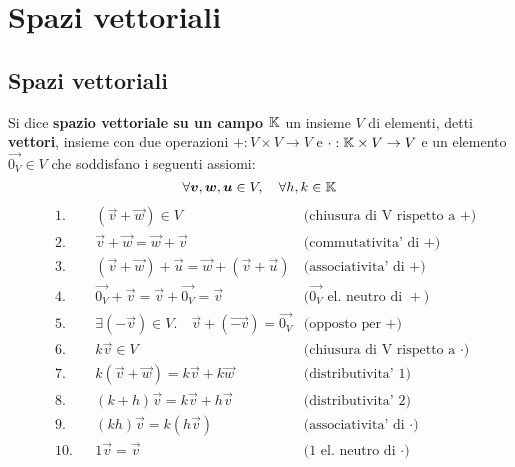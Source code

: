\chapter{Spazi vettoriali}

\section{Spazi vettoriali}
\begin{definition}
    Si dice \textbf{spazio vettoriale su un campo $\mathbb{K}$} un insieme $V$ di elementi, detti \textbf{vettori}, insieme con due operazioni $+ : V \times V \to V$ e $\cdot : \mathbb{K} \times V \to V$ e un elemento $\vec{0_V} \in V$ che soddisfano i seguenti assiomi:
    \[\forall \bm{v}, \bm{w}, \bm{u} \in V, \quad\forall h, k \in \mathbb{K} \]
    \begin{align}
        &\text{1.} &&(\vec{v} + \vec{w}) \in V                                        &\text{(chiusura di V rispetto a $+$)} \\      
        &\text{2.} &&\vec{v} + \vec{w} = \vec{w} + \vec{v}                              &\text{(commutativita' di $+$)} \\
        &\text{3.} &&(\vec{v} + \vec{w}) + \vec{u} = \vec{w} + (\vec{v} + \vec{u})        &\text{(associativita' di $+$)} \\
        &\text{4.} &&\vec{0_V} + \vec{v} = \vec{v} + \vec{0_V} = \vec{v}                 &\text{($\vec{0_V}$ el. neutro di $+$)} \\
        &\text{5.} &&\exists (-\vec{v}) \in V. \quad\vec{v} + (\vec{-v}) = \vec{0_V}    &\text{(opposto per $+$)} \\
        &\text{6.} &&k\vec{v} \in V                                                  &\text{(chiusura di V rispetto a $\cdot$)} \\
        &\text{7.} &&k(\vec{v} + \vec{w}) = k\vec{v} + k\vec{w}                         &\text{(distributivita' 1)} \\
        &\text{8.} &&(k + h)\vec{v}= k\vec{v} + h\vec{v}                               &\text{(distributivita' 2)} \\
        &\text{9.} &&(kh)\vec{v}= k(h\vec{v})                                         &\text{(associativita' di $\cdot$)} \\
        &\text{10.}&&1\vec{v}= \vec{v}                                                &\text{(1 el. neutro di $\cdot$)}
    \end{align}
\end{definition}
 
